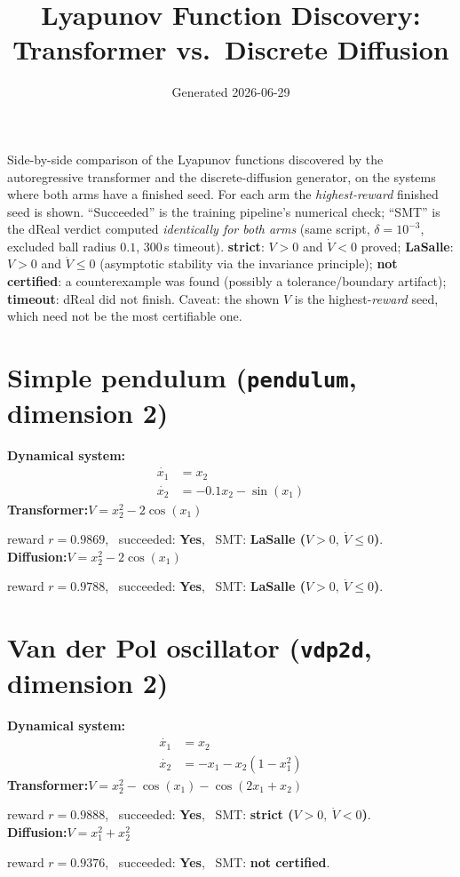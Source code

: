 \documentclass[11pt]{article}
\title{Lyapunov Function Discovery: Transformer vs.\ Discrete Diffusion}
\date{Generated 2026-06-29}
\begin{document}
\maketitle
\noindent Side-by-side comparison of the Lyapunov functions discovered by the autoregressive transformer and the discrete-diffusion generator, on the systems where both arms have a finished seed. For each arm the \emph{highest-reward} finished seed is shown. ``Succeeded'' is the training pipeline's numerical check; ``SMT'' is the dReal verdict computed \emph{identically for both arms} (same script, $\delta=10^{-3}$, excluded ball radius $0.1$, $300$\,s timeout). \textbf{strict}: $V>0$ and $\dot V<0$ proved; \textbf{LaSalle}: $V>0$ and $\dot V\le 0$ (asymptotic stability via the invariance principle); \textbf{not certified}: a counterexample was found (possibly a tolerance/boundary artifact); \textbf{timeout}: dReal did not finish. Caveat: the shown $V$ is the highest-\emph{reward} seed, which need not be the most certifiable one.\\[1ex]
\section*{Simple pendulum \quad (\texttt{pendulum}, dimension 2)}
\textbf{Dynamical system:}
\begin{align*}
\dot{x_{1}} &= x_{2} \\
\dot{x_{2}} &= - 0.1 x_{2} - \sin{\left(x_{1} \right)} 
\end{align*}
\textbf{Transformer:}\quad $V = x_{2}^{2} - 2 \cos{\left(x_{1} \right)}$
\par\noindent\hspace{1em}reward $r=0.9869$, \ succeeded: \textbf{Yes}, \ SMT: \textbf{LaSalle ($V>0,\ \dot V\le 0$)}.\\[0.5ex]
\textbf{Diffusion:}\quad $V = x_{2}^{2} - 2 \cos{\left(x_{1} \right)}$
\par\noindent\hspace{1em}reward $r=0.9788$, \ succeeded: \textbf{Yes}, \ SMT: \textbf{LaSalle ($V>0,\ \dot V\le 0$)}.\\[1ex]
\section*{Van der Pol oscillator \quad (\texttt{vdp2d}, dimension 2)}
\textbf{Dynamical system:}
\begin{align*}
\dot{x_{1}} &= x_{2} \\
\dot{x_{2}} &= - x_{1} - x_{2} \left(1 - x_{1}^{2}\right) 
\end{align*}
\textbf{Transformer:}\quad $V = x_{2}^{2} - \cos{\left(x_{1} \right)} - \cos{\left(2 x_{1} + x_{2} \right)}$
\par\noindent\hspace{1em}reward $r=0.9888$, \ succeeded: \textbf{Yes}, \ SMT: \textbf{strict ($V>0,\ \dot V<0$)}.\\[0.5ex]
\textbf{Diffusion:}\quad $V = x_{1}^{2} + x_{2}^{2}$
\par\noindent\hspace{1em}reward $r=0.9376$, \ succeeded: \textbf{Yes}, \ SMT: \textbf{not certified}.\\[1ex]
\end{document}
